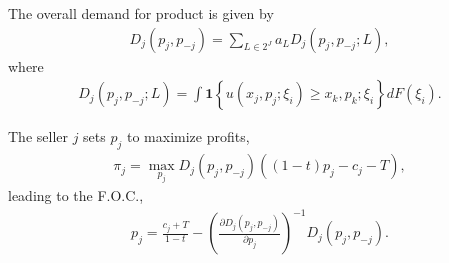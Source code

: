 The overall demand for product is given by
\begin{equation}
    \begin{aligned}
        D_j(p_j,p_{-j})=\sum_{L\in 2^J}a_L D_j(p_j,p_{-j};L),
    \end{aligned}
    \nonumber
\end{equation}
where
\begin{equation}
    \begin{aligned}
        D_j(p_j,p_{-j};L)=\int \mathbf{1}\left\{u(x_j,p_j;\xi_i)\geq x_k,p_k;\xi_i\right\}d F(\xi_i).
    \end{aligned}
    \nonumber
\end{equation}

The seller $j$ sets $p_j$ to maximize profits,
\begin{equation}
    \begin{aligned}
        \pi_j=\max_{p_j}D_j(p_j,p_{-j})\left((1-t)p_j-c_j-T\right),
    \end{aligned}
    \nonumber
\end{equation}
leading to the F.O.C.,
\begin{equation}
    \begin{aligned}
        p_j=\frac{c_j+T}{1-t}-\left(\frac{\partial D_j(p_j,p_{-j})}{\partial p_j}\right)^{-1}D_j(p_j,p_{-j}).
    \end{aligned}
    \nonumber
\end{equation}